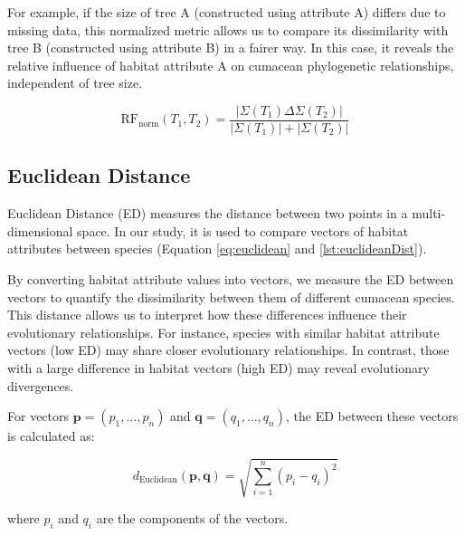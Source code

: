 For example, if the size of tree A (constructed using attribute A) differs due to missing data, this normalized metric allows us to compare its dissimilarity with tree B (constructed using attribute B) in a fairer way. In this case, it reveals the relative influence of habitat attribute A on cumacean phylogenetic relationships, independent of tree size.

\begin{equation}\label{eq:rf_norm}
    \text{RF}_{\text{norm}}(T_1, T_2) = \frac{| \Sigma(T_1) \Delta \Sigma(T_2) |}{| \Sigma(T_1) | + | \Sigma(T_2) |}
\end{equation}

\subsection{Euclidean Distance}\label{euclidean}

Euclidean Distance (ED) measures the distance between two points in a multi-dimensional space. In our study, it is used to compare vectors of habitat attributes between species (Equation \eqref{eq:euclidean} and \autoref{lst:euclideanDist}).

By converting habitat attribute values into vectors, we measure the ED between vectors to quantify the dissimilarity between them of different cumacean species. This distance allows us to interpret how these differences influence their evolutionary relationships. For instance, species with similar habitat attribute vectors (low ED) may share closer evolutionary relationships. In contrast, those with a large difference in habitat vectors (high ED) may reveal evolutionary divergences.

For vectors $\mathbf{p} = (p_1, \ldots, p_n)$ and $\mathbf{q} = (q_1, \ldots, q_n)$, the ED between these vectors is calculated as:

\begin{equation}\label{eq:euclidean}
    d_{\text{Euclidean}}(\mathbf{p}, \mathbf{q}) = \sqrt{\sum_{i=1}^{n} (p_i - q_i)^2}
\end{equation}

where $p_i$ and $q_i$ are the components of the vectors.

